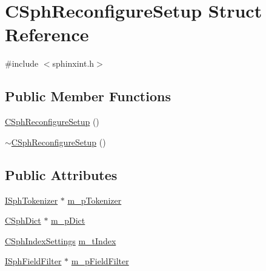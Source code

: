 \hypertarget{structCSphReconfigureSetup}{\section{C\-Sph\-Reconfigure\-Setup Struct Reference}
\label{structCSphReconfigureSetup}
}


{\ttfamily \#include $<$sphinxint.\-h$>$}

\subsection*{Public Member Functions}
\begin{DoxyCompactItemize}
\item 
\hyperlink{structCSphReconfigureSetup_a901805c0856598c04fa87f5238ba3754}{C\-Sph\-Reconfigure\-Setup} ()
\item 
\hyperlink{structCSphReconfigureSetup_af1a108e2f4fc69c899c5a1b90816ae8f}{$\sim$\-C\-Sph\-Reconfigure\-Setup} ()
\end{DoxyCompactItemize}
\subsection*{Public Attributes}
\begin{DoxyCompactItemize}
\item 
\hyperlink{classISphTokenizer}{I\-Sph\-Tokenizer} $\ast$ \hyperlink{structCSphReconfigureSetup_a3faa40e8b11f5a9da8767f461cb77a1e}{m\-\_\-p\-Tokenizer}
\item 
\hyperlink{classCSphDict}{C\-Sph\-Dict} $\ast$ \hyperlink{structCSphReconfigureSetup_a9342e258273181c7a3f25dc94c6e4311}{m\-\_\-p\-Dict}
\item 
\hyperlink{structCSphIndexSettings}{C\-Sph\-Index\-Settings} \hyperlink{structCSphReconfigureSetup_a35bd6922278066b38e4ec7f5f833a729}{m\-\_\-t\-Index}
\item 
\hyperlink{classISphFieldFilter}{I\-Sph\-Field\-Filter} $\ast$ \hyperlink{structCSphReconfigureSetup_a3abf8b015e73fd1cb3e62207f5fef7af}{m\-\_\-p\-Field\-Filter}
\end{DoxyCompactItemize}


